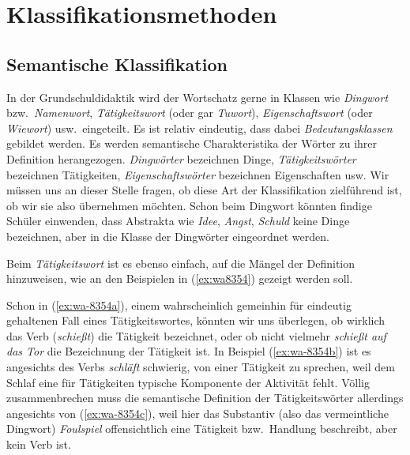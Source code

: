 \section{Klassifikationsmethoden}

\label{sec:klassifikationsmethoden}

\subsection{Semantische Klassifikation}

\label{sec:semantischeklassifikation}


In der Grundschuldidaktik wird der Wortschatz gerne in Klassen wie \textit{Dingwort} bzw.\ \textit{Namenwort}, \textit{Tätigkeitswort} (oder gar \textit{Tuwort}), \textit{Eigenschaftswort} (oder \textit{Wiewort}) usw.\ eingeteilt.
Es ist relativ eindeutig, dass dabei \textit{Bedeutungsklassen} gebildet werden.
Es werden semantische Charakteristika der Wörter zu ihrer Definition herangezogen.
\textit{Dingwörter} bezeichnen Dinge, \textit{Tätigkeitswörter} bezeichnen Tätigkeiten, \textit{Eigenschaftswörter} bezeichnen Eigenschaften usw.
Wir müssen uns an dieser Stelle fragen, ob diese Art der Klassifikation zielführend ist, ob wir sie also übernehmen möchten.
Schon beim Dingwort könnten findige Schüler einwenden, dass Abstrakta wie \textit{Idee}, \textit{Angst}, \textit{Schuld} keine Dinge bezeichnen, aber in die Klasse der Dingwörter eingeordnet werden.

Beim \textit{Tätigkeitswort} ist es ebenso einfach, auf die Mängel der Definition hinzuweisen, wie an den Beispielen in (\ref{ex:wa8354}) gezeigt werden soll.

\begin{exe}
  \ex\label{ex:wa8354}
  \begin{xlist}
  \end{xlist}
\end{exe}

Schon in (\ref{ex:wa-8354a}), einem wahrscheinlich gemeinhin für eindeutig gehaltenen Fall eines Tätigkeitswortes, könnten wir uns überlegen, ob wirklich das Verb (\textit{schießt}) die Tätigkeit bezeichnet, oder ob nicht vielmehr \textit{schießt auf das Tor} die Bezeichnung der Tätigkeit ist.
In Beispiel (\ref{ex:wa-8354b}) ist es angesichts des Verbs \textit{schläft} schwierig, von einer Tätigkeit zu sprechen, weil dem Schlaf eine für Tätigkeiten typische Komponente der Aktivität fehlt.
Völlig zusammenbrechen muss die semantische Definition der Tätigkeitswörter allerdings angesichts von (\ref{ex:wa-8354c}), weil hier das Substantiv (also das vermeintliche Dingwort) \textit{Foulspiel} offensichtlich eine Tätigkeit bzw.\ Handlung beschreibt, aber kein Verb ist.

